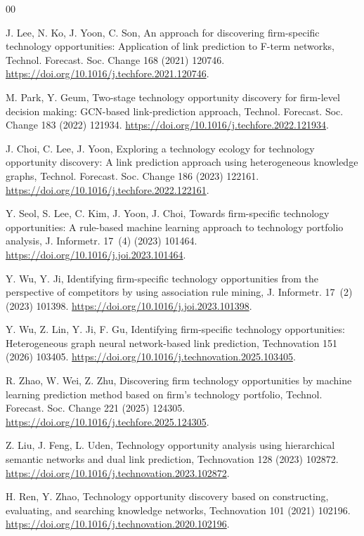\documentclass[preprint,12pt,3p]{elsarticle}
\begin{document}
\begin{thebibliography}{00}

J. Lee, N. Ko, J. Yoon, C. Son, An approach for discovering firm-specific technology opportunities: Application of link prediction to F-term networks, Technol. Forecast. Soc. Change 168 (2021) 120746. \url{https://doi.org/10.1016/j.techfore.2021.120746}.

M. Park, Y. Geum, Two-stage technology opportunity discovery for firm-level decision making: GCN-based link-prediction approach, Technol. Forecast. Soc. Change 183 (2022) 121934. \url{https://doi.org/10.1016/j.techfore.2022.121934}.

J. Choi, C. Lee, J. Yoon, Exploring a technology ecology for technology opportunity discovery: A link prediction approach using heterogeneous knowledge graphs, Technol. Forecast. Soc. Change 186 (2023) 122161. \url{https://doi.org/10.1016/j.techfore.2022.122161}.

Y. Seol, S. Lee, C. Kim, J. Yoon, J. Choi, Towards firm-specific technology opportunities: A rule-based machine learning approach to technology portfolio analysis, J. Informetr. 17~(4) (2023) 101464. \url{https://doi.org/10.1016/j.joi.2023.101464}.

Y. Wu, Y. Ji, Identifying firm-specific technology opportunities from the perspective of competitors by using association rule mining, J. Informetr. 17~(2) (2023) 101398. \url{https://doi.org/10.1016/j.joi.2023.101398}.

Y. Wu, Z. Lin, Y. Ji, F. Gu, Identifying firm-specific technology opportunities: Heterogeneous graph neural network-based link prediction, Technovation 151 (2026) 103405. \url{https://doi.org/10.1016/j.technovation.2025.103405}.

R. Zhao, W. Wei, Z. Zhu, Discovering firm technology opportunities by machine learning prediction method based on firm's technology portfolio, Technol. Forecast. Soc. Change 221 (2025) 124305. \url{https://doi.org/10.1016/j.techfore.2025.124305}.

Z. Liu, J. Feng, L. Uden, Technology opportunity analysis using hierarchical semantic networks and dual link prediction, Technovation 128 (2023) 102872. \url{https://doi.org/10.1016/j.technovation.2023.102872}.

H. Ren, Y. Zhao, Technology opportunity discovery based on constructing, evaluating, and searching knowledge networks, Technovation 101 (2021) 102196. \url{https://doi.org/10.1016/j.technovation.2020.102196}.


\end{thebibliography}
\end{document}
